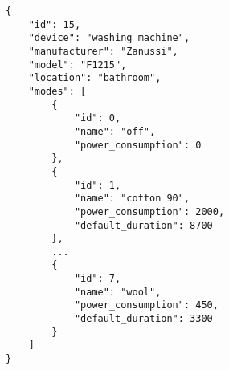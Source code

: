 \begin{lstlisting}[language=numbered,caption={JSON file describing the washing machine},label=code:appliance_washing_machine,float,floatplacement=H]
{
	"id": 15,
	"device": "washing machine",
	"manufacturer": "Zanussi",
	"model": "F1215",
	"location": "bathroom",
	"modes": [
		{
			"id": 0,
			"name": "off",
			"power_consumption": 0
		},
		{
			"id": 1,
			"name": "cotton 90",
			"power_consumption": 2000,
			"default_duration": 8700
		},
		...	
		{
			"id": 7,
			"name": "wool",
			"power_consumption": 450,
			"default_duration": 3300
		}
	]
}
\end{lstlisting}